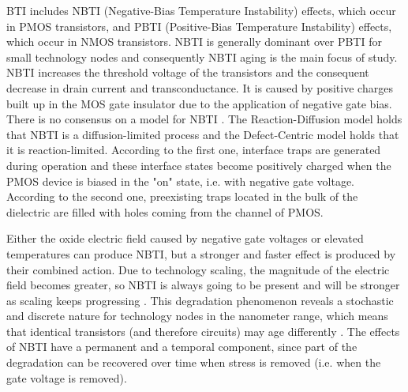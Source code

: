 BTI includes NBTI (Negative-Bias Temperature Instability) effects, which occur in PMOS transistors, and PBTI (Positive-Bias Temperature Instability) effects, which occur in NMOS transistors. NBTI is generally dominant over PBTI for small technology nodes \cite{Kraak2018} and consequently NBTI aging is the main focus of study. NBTI increases the threshold voltage of the transistors and the consequent decrease in drain current and transconductance. It is caused by positive charges built up in the MOS gate insulator due to the application of negative gate bias. There is no consensus on a model for NBTI \cite{Stathis2018}. The Reaction-Diffusion model holds that NBTI is a diffusion-limited process and the Defect-Centric model holds that it is reaction-limited. According to the first one, interface traps are generated during operation and these interface states become positively charged when the PMOS device is biased in the "on" state, i.e. with negative gate voltage. According to the second one, preexisting traps located in the bulk of the dielectric are filled with holes coming from the channel of PMOS.

Either the oxide electric field caused by negative gate voltages or elevated temperatures can produce NBTI, but a stronger and faster effect is produced by their combined action. Due to technology scaling, the magnitude of the electric field becomes greater, so NBTI is always going to be present and will be stronger as scaling keeps progressing \cite{Schroder2003}. This degradation phenomenon reveals a stochastic and discrete nature for technology nodes in the nanometer range, which means that identical transistors (and therefore circuits) may age differently \cite{Kaczer2010}. The effects of NBTI have a permanent and a temporal component, since part of the degradation can be recovered over time when stress is removed (i.e. when the gate voltage is removed). 


